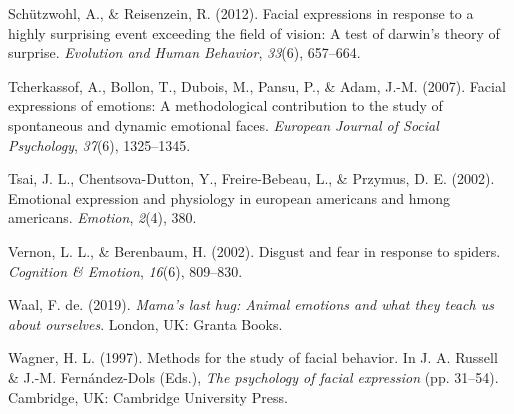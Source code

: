 \documentclass[man]{apa6}
\begin{document}
\leavevmode\hypertarget{ref-schutzwohl2012facial}{}%
Schützwohl, A., \& Reisenzein, R. (2012). Facial expressions in response to a highly surprising event exceeding the field of vision: A test of darwin's theory of surprise. \emph{Evolution and Human Behavior}, \emph{33}(6), 657--664.

\leavevmode\hypertarget{ref-tcherkassof2007facial}{}%
Tcherkassof, A., Bollon, T., Dubois, M., Pansu, P., \& Adam, J.-M. (2007). Facial expressions of emotions: A methodological contribution to the study of spontaneous and dynamic emotional faces. \emph{European Journal of Social Psychology}, \emph{37}(6), 1325--1345.

\leavevmode\hypertarget{ref-tsai2002emotional}{}%
Tsai, J. L., Chentsova-Dutton, Y., Freire-Bebeau, L., \& Przymus, D. E. (2002). Emotional expression and physiology in european americans and hmong americans. \emph{Emotion}, \emph{2}(4), 380.

\leavevmode\hypertarget{ref-vernon2002disgust}{}%
Vernon, L. L., \& Berenbaum, H. (2002). Disgust and fear in response to spiders. \emph{Cognition \& Emotion}, \emph{16}(6), 809--830.

\leavevmode\hypertarget{ref-de2019mama}{}%
Waal, F. de. (2019). \emph{Mama's last hug: Animal emotions and what they teach us about ourselves}. London, UK: Granta Books.

\leavevmode\hypertarget{ref-wagner1997methods}{}%
Wagner, H. L. (1997). Methods for the study of facial behavior. In J. A. Russell \& J.-M. Fernández-Dols (Eds.), \emph{The psychology of facial expression} (pp. 31--54). Cambridge, UK: Cambridge University Press.

\endgroup
\end{document}
